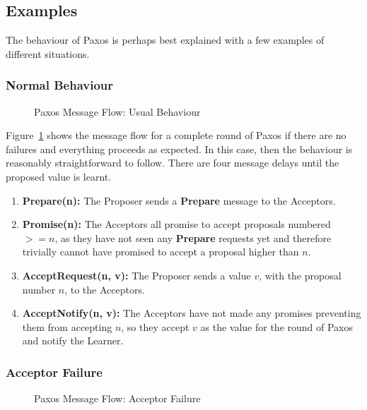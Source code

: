 \documentclass[12pt,twoside,notitlepage]{report}
\newcommand{\lwincludegraphics}[2][]{%
  \sbox{0}{\texttt{[image: \#2]}}%
  \ifdim\wd0>\linewidth
    \resizebox{\linewidth}{!}{\box0 }%
  \else
    \leavevmode\box0
  \fi}
\newcommand{\msg}[1] {{\bf #1}}         %
\begin{document}
\subsection*{Examples}

The behaviour of Paxos is perhaps best explained with a few examples of different situations.

\subsubsection*{Normal Behaviour}

\begin{figure}[h!]
\centering
\lwincludegraphics{figs/paxos-msg-flow-usual.eps}
\caption{\label{fig:paxos-usual}Paxos Message Flow: Usual Behaviour}
\end{figure}

Figure~\ref{fig:paxos-usual} shows the message flow for a
complete round of Paxos if there are no failures and everything proceeds as expected. In this
case, then the behaviour is reasonably straightforward to follow. There are four message delays
until the proposed value is learnt.

\begin{enumerate}
\item \msg{Prepare(n):} The Proposer sends a \msg{Prepare} message to the Acceptors.
\item \msg{Promise(n):} The Acceptors all promise to accept proposals numbered $>= n$, as they
	have not seen any \msg{Prepare} requests yet and therefore trivially cannot have promised
	to accept a proposal higher than $n$.
\item \msg{AcceptRequest(n, v):} The Proposer sends a value $v$, with the proposal number $n$, to
	the Acceptors.
\item \msg{AcceptNotify(n, v):} The Acceptors have not made any promises preventing them from
	accepting $n$, so they accept $v$ as the value for the round of Paxos and notify the
	Learner.
\end{enumerate}

\subsubsection*{Acceptor Failure}

\begin{figure}[h!]
\centering
\lwincludegraphics{figs/paxos-msg-flow-one-acceptor-fail.eps}
\caption{\label{fig:paxos-acceptor-fail}Paxos Message Flow: Acceptor Failure}
\end{figure}
\end{document}
